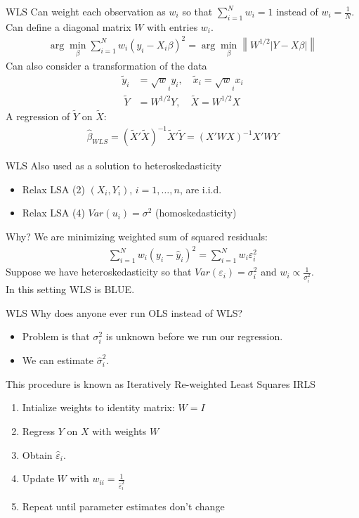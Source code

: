 \documentclass[aspectratio=169]{beamer}
\newcommand{\norm}[1]{\left\lVert#1\right\rVert}
\begin{document}
\begin{frame}{WLS}
Can weight each observation as $w_i$ so that $\sum_{i=1}^N w_i = 1$ instead of $w_i=\frac{1}{N}$.\\
Can define a diagonal matrix $W$ with entries $w_i$.
\begin{align*}
\arg \min_{\beta} \sum_{i=1}^N w_i (y_i - X_i \beta)^2 = \arg \min_{\beta} \norm{W^{1/2}|Y - X \beta| } 
\end{align*}
Can also consider a transformation of the data 
\begin{align*}
\tilde{y}_i &= \sqrt{w}_i y_i , \quad  \tilde{x}_i = \sqrt{w}_i x_i \\\
\tilde{Y} &= W^{1/2} Y, \quad  \tilde{X} = W^{1/2} X
\end{align*}
A regression of $\tilde{Y}$ on $\tilde{X}$:
\begin{align*}
\widehat{\beta}_{WLS} = (\tilde{X}'\tilde{X})^{-1}\tilde{X}'\tilde{Y} = (X' W X)^{-1} X' W Y
\end{align*}
\end{frame}

\begin{frame}{WLS}
Also used as a solution to heteroskedasticity
\begin{itemize}
    \item Relax LSA (2) $(X_i,Y_i)$, $i =1,\ldots,n$, are i.i.d.
    \item Relax LSA (4) $Var(u_i) = \sigma^2$ (homoskedasticity)
\end{itemize}
Why? We are minimizing weighted sum of squared residuals:
\begin{align*}
\sum_{i=1}^N w_i (y_i - \hat{y}_i)^2 = \sum_{i=1}^N w_i \varepsilon_i^2 
\end{align*}
Suppose we have heteroskedasticity so that $Var(\varepsilon_i) = \sigma_i^2$ and $w_i \propto \frac{1}{\sigma_i^2}$.\\
In this setting WLS is \alert{BLUE}.
\end{frame}

\begin{frame}{WLS}
Why does anyone ever run OLS instead of WLS?
\begin{itemize}
\item Problem is that $\sigma_i^2$ is unknown before we run our regression.
\item We can estimate $\widehat{\sigma}_i^2$.
\end{itemize}
This procedure is known as Iteratively Re-weighted Least Squares \alert{IRLS}
\begin{enumerate}
\item Intialize weights to identity matrix: $W = I$
\item Regress $Y$ on $X$ with weights $W$
\item Obtain $\widehat{\varepsilon}_i$.
\item Update $W$ with $w_{ii} = \frac{1}{\widehat{\varepsilon}_i^2}$
\item Repeat until parameter estimates don't change
\end{enumerate}
\end{frame}
\end{document}
